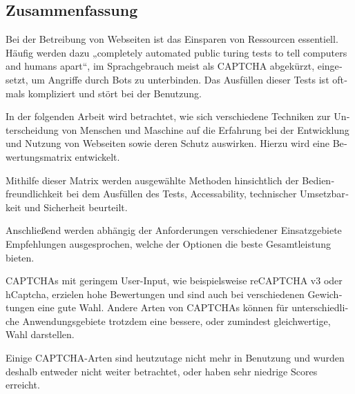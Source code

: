 \begin{otherlanguage}{ngerman}
	\chapter*{Zusammenfassung}
	Bei der Betreibung von Webseiten ist das Einsparen von Ressourcen essentiell. 
	Häufig werden dazu „completely automated public turing tests to tell computers and humans apart“, im Sprachgebrauch meist als CAPTCHA abgekürzt, eingesetzt, um Angriffe durch Bots zu unterbinden. 
	Das Ausfüllen dieser Tests ist oftmals kompliziert und stört bei der Benutzung.

	In der folgenden Arbeit wird betrachtet, wie sich verschiedene Techniken zur Unterscheidung von Menschen und Maschine auf die Erfahrung bei der Entwicklung und Nutzung von Webseiten sowie deren Schutz auswirken. 
	Hierzu wird eine Bewertungsmatrix entwickelt. 

	Mithilfe dieser Matrix werden ausgewählte Methoden hinsichtlich der Bedienfreundlichkeit bei dem Ausfüllen des Tests, Accessability, technischer Umsetzbarkeit und Sicherheit beurteilt. 
	 
	Anschließend werden abhängig der Anforderungen verschiedener Einsatzgebiete Empfehlungen ausgesprochen, welche der Optionen die beste Gesamtleistung bieten.

	CAPTCHAs mit geringem User-Input, wie beispielsweise reCAPTCHA v3 oder hCaptcha, erzielen hohe Bewertungen und sind auch bei verschiedenen Gewichtungen
	eine gute Wahl. 
	Andere Arten von CAPTCHAs können für unterschiedliche Anwendungsgebiete trotzdem eine bessere, oder zumindest gleichwertige, Wahl darstellen.
	
	Einige CAPTCHA-Arten sind heutzutage nicht mehr in Benutzung und wurden deshalb entweder nicht weiter betrachtet,
	oder haben sehr niedrige Scores erreicht.

\end{otherlanguage}
